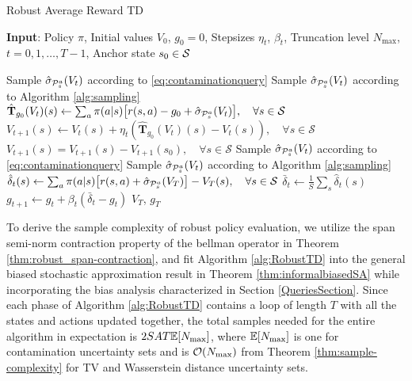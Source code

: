 \begin{algorithm}[htb]
\caption{Robust Average Reward TD}
\label{alg:RobustTD}
\textbf{Input}: Policy $\pi$, Initial values $V_0$, $g_0=0$, Stepsizes $\eta_t$, $\beta_t$, Truncation level $N_{\max}$, $t=0,1,\ldots, T-1$, Anchor state $s_0\in\mathcal{S}$
\begin{algorithmic}[1] 
 Sample $\hat{\sigma}_{\mathcal{P}^a_s}(V_t)$ according to \eqref{eq:contaminationquery}
 Sample $\hat{\sigma}_{\mathcal{P}^a_s}(V_t)$ according to Algorithm \ref{alg:sampling}
\EndIf
\EndFor
\State $\hat{\mathbf{T}}_{g_0}(V_t)(s) \leftarrow \sum_{a} \pi(a|s) \big[ r(s,a) - g_0 +  \hat{\sigma}_{\mathcal{P}^a_s}(V_t) \big], \quad \forall s \in \mathcal{S}$
\State  $V_{t+1}(s) \leftarrow V_t(s) + \eta_t \left( \hat{\mathbf{T}}_{g_0}(V_t)(s) - V_t(s) \right), \quad \forall s \in \mathcal{S}$
\State  $V_{t+1}(s) = V_{t+1}(s) - V_{t+1}(s_0), \quad \forall s \in \mathcal{S}$
\EndFor
{}
 Sample $\hat{\sigma}_{\mathcal{P}^a_s}(V_t)$ according to \eqref{eq:contaminationquery}
 Sample $\hat{\sigma}_{\mathcal{P}^a_s}(V_t)$ according to Algorithm \ref{alg:sampling}
\EndIf
\EndFor
\State $\hat{\delta}_t(s) \leftarrow \sum_{a}\pi(a|s) \big[ r(s,a) +  \hat{\sigma}_{\mathcal{P}^a_s}(V_T) \big]- V_T(s)  , \quad \forall s \in \mathcal{S}$
\State $\bar{\delta}_t \leftarrow \frac{1}{S}\sum_s \hat{\delta}_t(s)$
\State $g_{t+1} \leftarrow g_t + \beta_t(\bar{\delta}_t-g_t)$
\EndFor
\Return $V_T$, $g_T$
\end{algorithmic}
\end{algorithm}


To derive the sample complexity of robust policy evaluation, we utilize the span semi-norm contraction property of the bellman operator in Theorem \ref{thm:robust_span-contraction}, and fit Algorithm \ref{alg:RobustTD} into the general biased stochastic approximation result in Theorem \ref{thm:informalbiasedSA} while incorporating the bias analysis characterized in Section \ref{QueriesSection}. Since each phase of Algorithm \ref{alg:RobustTD} contains a loop of length $T$ with all the states and actions updated together, the total samples needed for the entire algorithm in expectation is $2SAT \mathbb{E}[N_{\max}]$, where $\mathbb{E}[N_{\max}]$ is one for contamination uncertainty sets and is $\operatorname*{\mathcal{O}}(N_{\max})$ from Theorem \ref{thm:sample-complexity} for TV and Wasserstein distance uncertainty sets.


